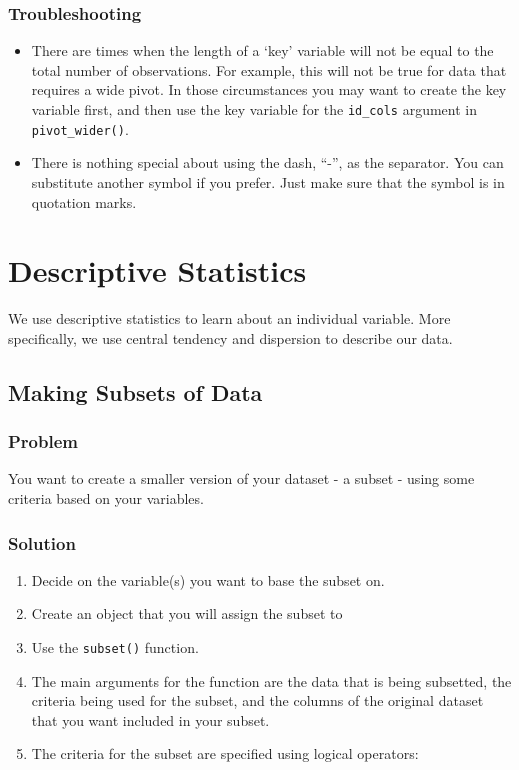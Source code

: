 \documentclass[
]{book}
\providecommand{\tightlist}{%
  \setlength{\itemsep}{0pt}\setlength{\parskip}{0pt}}
\begin{document}
\hypertarget{troubleshooting-24}{%
\subsection{Troubleshooting}\label{troubleshooting-24}}

\begin{itemize}
\tightlist
\item
  There are times when the length of a `key' variable will not be equal to the total number of observations. For example, this will not be true for data that requires a wide pivot. In those circumstances you may want to create the key variable first, and then use the key variable for the \texttt{id\_cols} argument in \texttt{pivot\_wider()}.
\item
  There is nothing special about using the dash, ``-'', as the separator. You can substitute another symbol if you prefer. Just make sure that the symbol is in quotation marks.
\end{itemize}

\hypertarget{descriptive-statistics}{%
\chapter{Descriptive Statistics}\label{descriptive-statistics}}

We use descriptive statistics to learn about an individual variable. More specifically, we use central tendency and dispersion to describe our data.

\hypertarget{subset}{%
\section{Making Subsets of Data}\label{subset}}

\hypertarget{problem-28}{%
\subsection{Problem}\label{problem-28}}

You want to create a smaller version of your dataset - a subset - using some criteria based on your variables.

\hypertarget{solution-27}{%
\subsection{Solution}\label{solution-27}}

\begin{enumerate}
\def\labelenumi{\arabic{enumi}.}
\tightlist
\item
  Decide on the variable(s) you want to base the subset on.
\item
  Create an object that you will assign the subset to
\item
  Use the \texttt{subset()} function.
\item
  The main arguments for the function are the data that is being subsetted, the criteria being used for the subset, and the columns of the original dataset that you want included in your subset.
\item
  The criteria for the subset are specified using logical operators:
\end{enumerate}
\end{document}
